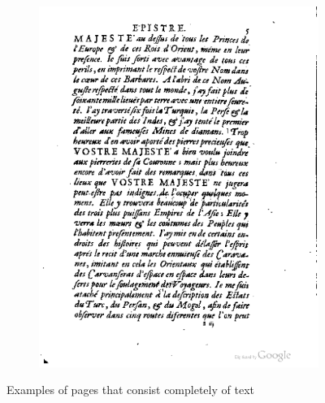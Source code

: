 \begin{figure}
\begin{subfigure}[b]{0.4\textwidth}
    \includegraphics[width=\textwidth]{resources/500_0010}
    \end{subfigure}
    \caption{Examples of pages that consist completely of text}
    \label{fig:textExamples}
\end{figure}

